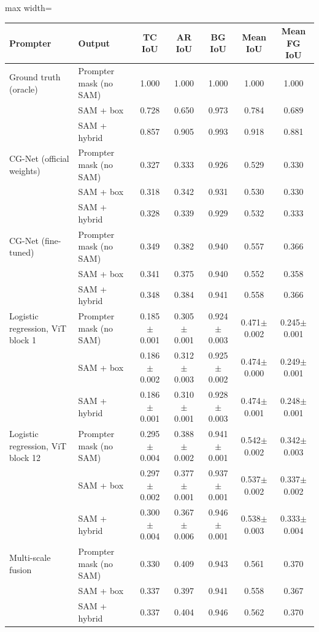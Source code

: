 \begin{table}[htbp]
\centering
\small
\begin{adjustbox}{max width=\linewidth}
\begin{tabular}{llccccc}
\toprule
Prompter & Output & TC IoU & AR IoU & BG IoU & Mean IoU & Mean FG IoU \\
\midrule
Ground truth (oracle) & Prompter mask (no SAM) & 1.000 & 1.000 & 1.000 & 1.000 & 1.000 \\
 & SAM + box & 0.728 & 0.650 & 0.973 & 0.784 & 0.689 \\
 & SAM + hybrid & 0.857 & 0.905 & 0.993 & 0.918 & 0.881 \\
\midrule
CG-Net (official weights) & Prompter mask (no SAM) & 0.327 & 0.333 & 0.926 & 0.529 & 0.330 \\
 & SAM + box & 0.318 & 0.342 & 0.931 & 0.530 & 0.330 \\
 & SAM + hybrid & 0.328 & 0.339 & 0.929 & 0.532 & 0.333 \\
\midrule
CG-Net (fine-tuned) & Prompter mask (no SAM) & 0.349 & 0.382 & 0.940 & 0.557 & 0.366 \\
 & SAM + box & 0.341 & 0.375 & 0.940 & 0.552 & 0.358 \\
 & SAM + hybrid & 0.348 & 0.384 & 0.941 & 0.558 & 0.366 \\
\midrule
Logistic regression, ViT block 1 & Prompter mask (no SAM) & 0.185$\pm$0.001 & 0.305$\pm$0.001 & 0.924$\pm$0.003 & 0.471$\pm$0.002 & 0.245$\pm$0.001 \\
 & SAM + box & 0.186$\pm$0.002 & 0.312$\pm$0.003 & 0.925$\pm$0.002 & 0.474$\pm$0.000 & 0.249$\pm$0.001 \\
 & SAM + hybrid & 0.186$\pm$0.001 & 0.310$\pm$0.001 & 0.928$\pm$0.003 & 0.474$\pm$0.001 & 0.248$\pm$0.001 \\
\midrule
Logistic regression, ViT block 12 & Prompter mask (no SAM) & 0.295$\pm$0.004 & 0.388$\pm$0.002 & 0.941$\pm$0.001 & 0.542$\pm$0.002 & 0.342$\pm$0.003 \\
 & SAM + box & 0.297$\pm$0.002 & 0.377$\pm$0.001 & 0.937$\pm$0.001 & 0.537$\pm$0.002 & 0.337$\pm$0.002 \\
 & SAM + hybrid & 0.300$\pm$0.004 & 0.367$\pm$0.006 & 0.946$\pm$0.001 & 0.538$\pm$0.003 & 0.333$\pm$0.004 \\
\midrule
Multi-scale fusion & Prompter mask (no SAM) & 0.330 & 0.409 & 0.943 & 0.561 & 0.370 \\
 & SAM + box & 0.337 & 0.397 & 0.941 & 0.558 & 0.367 \\
 & SAM + hybrid & 0.337 & 0.404 & 0.946 & 0.562 & 0.370 \\

\end{tabular}
\end{adjustbox}
\end{table}
